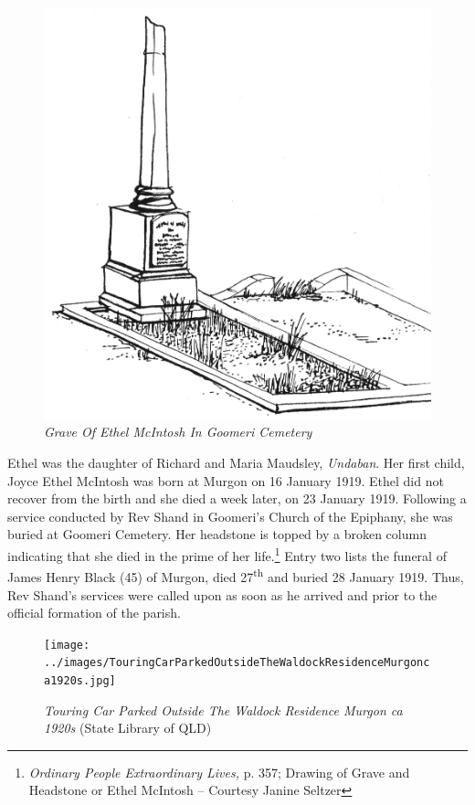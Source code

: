 \begin{figure}
\begin{center}
\includegraphics[width=.7\linewidth,center]{../images/graveOfEthelMcIntoshInGoomeriCemetery.jpg}
\caption{\itshape Grave Of Ethel McIntosh In Goomeri Cemetery}
\end{center}
\end{figure}




Ethel was the daughter of Richard and Maria Maudsley, \emph{Undaban}. Her first child, Joyce Ethel McIntosh was born at Murgon on 16 January 1919. Ethel did not recover from the birth and she died a week later, on 23 January 1919. Following a service conducted by Rev Shand in Goomeri's Church of the Epiphany, she was buried at Goomeri Cemetery. Her headstone is topped by a broken column indicating that she died in the prime of her life.\footnote{\emph{Ordinary People Extraordinary Lives,} p. 357; Drawing of Grave and Headstone or Ethel McIntosh -- Courtesy Janine Seltzer} Entry two lists the funeral of James Henry Black (45) of Murgon, died 27\textsuperscript{th} and buried 28 January 1919. Thus, Rev Shand's services were called upon as soon as he arrived and prior to the official formation of the parish.








\begin{figure}[!htb]
\begin{center}
\texttt{[image: ../images/TouringCarParkedOutsideTheWaldockResidenceMurgonca1920s.jpg]}
\caption{{\itshape Touring Car Parked Outside The Waldock Residence Murgon ca 1920s} {\scriptsize(State Library of QLD)}}
\end{center}
\end{figure}




